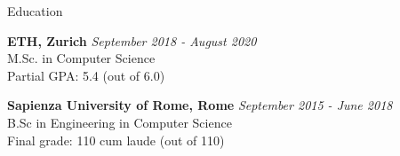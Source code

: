 \documentclass{resume}
\begin{document}

\begin{rSection}{Education}

{\bf ETH, Zurich} \hfill {\em September 2018 - August 2020} \\ 
M.Sc. in Computer Science\\
Partial GPA: 5.4 (out of 6.0)

{\bf Sapienza University of Rome, Rome} \hfill {\em September 2015 - June 2018} \\ 
B.Sc in Engineering in Computer Science\\
Final grade: 110 cum laude (out of 110)

\end{rSection}

\end{document}
